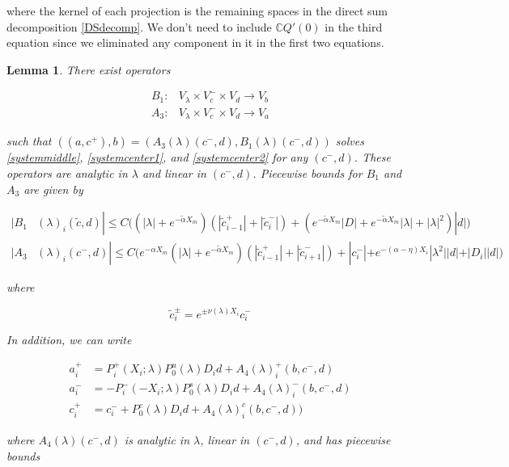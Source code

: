 \documentclass[12pt]{article}
\def\C{{\mathbb C}}
\newtheorem{lemma}{Lemma}
\begin{document}
where the kernel of each projection is the remaining spaces in the direct sum decomposition \eqref{DSdecomp}. We don't need to include $\C Q'(0)$ in the third equation since we eliminated any component in it in the first two equations.


\begin{lemma}\label{inv2}
There exist operators

\begin{align*}
B_1: &V_\lambda \times V_c^- \times V_d \rightarrow V_b \\
A_3: &V_\lambda \times V_c^- \times V_d \rightarrow V_a 
\end{align*}

such that $( (a, c^+) , b ) = ( A_3(\lambda)(c^-,d), B_1(\lambda)(c^-, d) )$ solves \eqref{systemmiddle}, \eqref{systemcenter1}, and \eqref{systemcenter2} for any $(c^-, d)$. These operators are analytic in $\lambda$ and linear in $(c^-,d)$. Piecewise bounds for $B_1$ and $A_3$ are given by

\begin{align}
|B_1&(\lambda)_i(\tilde{c}, d)| \leq C\Big( 
(|\lambda| + e^{-\tilde{\alpha}X_m})( |\tilde{c}_{i-1}^+| + |\tilde{c}_i^-|) + ( e^{-\tilde{\alpha}X_m} |D| + e^{-\tilde{\alpha}X_m}|\lambda| + |\lambda|^2)|d| \Big) \\
|A_3&(\lambda)_i(c^-, d)|
\leq C \Big(  
e^{-\alpha X_m} (|\lambda| + e^{-\tilde{\alpha}X_m})(|\tilde{c}_{i-1}^+| + |\tilde{c}_{i+1}^-|) +|c_i^-| + e^{-(\alpha - \eta) X_i} |\lambda^2||d| + |D_i||d| \Big)
\end{align} 

where

\begin{equation}\label{tildec}
\tilde{c}_i^\pm = e^{\pm \nu(\lambda) X_i} c_i^-
\end{equation}

In addition, we can write

\begin{align*}
a_i^+ &= P_i^+(X_i; \lambda) P_0^u(\lambda) D_i d + A_4(\lambda)_i^+(b, c^-, d) \\
a_i^- &= -P_i^-(-X_i; \lambda) P_0^s(\lambda) D_i d + A_4(\lambda)_i^-(b, c^-, d) \\
c_i^+ &= c_i^- + P_0^c(\lambda) D_i d + A_4(\lambda)_i^c(b, c^-, d) )
\end{align*}

where $A_4(\lambda)(c^-, d)$ is analytic in $\lambda$, linear in $(c^-, d)$, and has piecewise bounds


\end{lemma}
\end{document}
